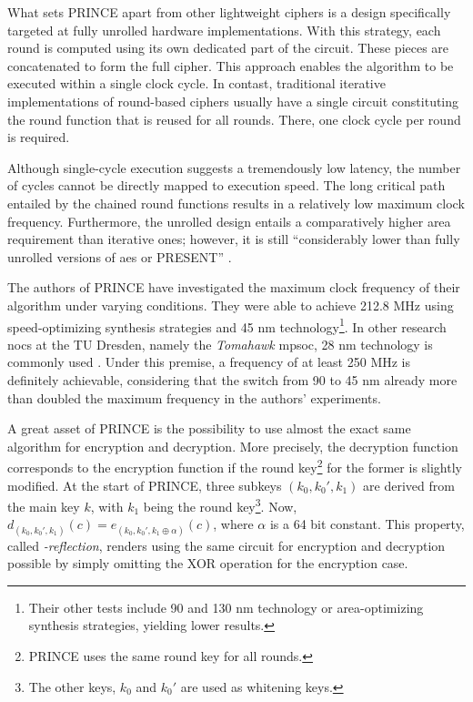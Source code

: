 What sets PRINCE apart from other lightweight ciphers is a design specifically targeted at fully unrolled hardware implementations. With this
strategy, each round is computed using its own dedicated part of the circuit. These pieces are concatenated to form the full cipher. This approach
enables the algorithm to be executed within a single clock cycle. In contast, traditional iterative implementations of round-based ciphers usually
have a single circuit constituting the round function that is reused for all rounds. There, one clock cycle per round is required.

Although single-cycle execution suggests a tremendously low latency, the number of cycles cannot be directly mapped to execution speed. The long critical path
entailed by the chained round functions results in a relatively low maximum clock frequency. Furthermore, the unrolled design entails a comparatively
higher area requirement than iterative ones; however, it is still \enquote{considerably lower than fully unrolled versions of \gls{aes} or PRESENT}
\cite[3]{borghoff12prince}.

The authors of PRINCE have investigated the maximum clock frequency of their algorithm under varying conditions. They were able to achieve 212.8 MHz
using speed-optimizing synthesis strategies and 45 nm technology\footnote{Their other tests include 90 and 130 nm technology or area-optimizing
synthesis strategies, yielding lower results.}. In other research \glspl{noc} at the TU Dresden, namely the \textit{Tomahawk}
\gls{mpsoc}, 28 nm technology is commonly used \cite[35]{cfaedreport}. Under
this premise, a frequency of at least 250 MHz is definitely achievable, considering that the switch from 90 to 45 nm already more than doubled
the maximum frequency in the authors' experiments.

A great asset of PRINCE is the possibility to use almost the exact same algorithm for encryption and decryption. More precisely, the decryption
function corresponds to the encryption function if the round key\footnote{PRINCE uses the same round key for all rounds.} for the former is slightly
modified. At the start of PRINCE, three subkeys $(k_0, k_0', k_1)$ are derived from the main key $k$, with $k_1$ being the round key\footnote{The
other keys, $k_0$ and $k_0'$ are used as whitening keys.}. Now, $d_{(k_0, k_0', k_1)}(c) = e_{(k_0, k_0', k_1 \oplus \alpha)}(c)$, where $\alpha$ is a
64 bit constant. This property, called \textit{\alpha-reflection}, renders using the same circuit for encryption and decryption possible by simply
omitting the XOR operation for the encryption case.

